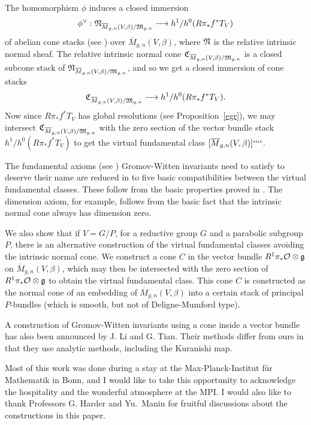 \documentclass{article}
\newcommand{\dual}[1]{{{#1}^{\vee}}}
\newcommand{\virt}{\mbox{\tiny virt}}
\newcommand{\upst}{^{\ast}}
\newcommand{\lst}{_{\ast}}
\newcommand{\NN}{{\frak N}}
\newcommand{\MM}{{\frak M}}
\newcommand{\Gg}{{\frak g}}
\newcommand{\CC}{{\frak C}}
\renewcommand{\O}{{\cal O}}
\newcommand{\ol}{\overline}
\begin{document}
The homomorphism $\phi$ induces a closed immersion
\[\dual{\phi}:\NN_{\ol{M}_{g,n}(V,\beta) / \MM_{g,n}}\longrightarrow
h^1/h^0(R\pi\lst f\upst T_V)\] of abelian cone stacks (see \cite{BF})
over $\ol{M}_{g,n}(V,\beta)$, where $\NN$ is the relative intrinsic
normal sheaf. The relative intrinsic normal cone
$\CC_{\ol{M}_{g,n}(V,\beta) / \MM_{g,n}}$ is a closed subcone stack of
$\NN_{\ol{M}_{g,n}(V,\beta) / \MM_{g,n}}$, and so we get a closed
immersion of cone stacks $$\CC_{\ol{M}_{g,n}(V,\beta) /
\MM_{g,n}} \longrightarrow h^1/h^0(R\pi\lst f\upst T_V).$$ Now since
$R\pi\lst f\upst T_V$ has global resolutions (see
Proposition~\ref{egr}), we may intersect $\CC_{\ol{M}_{g,n}(V,\beta) /
\MM_{g,n}}$ with the zero section of the vector bundle stack
$h^1/h^0(R\pi\lst f\upst T_V)$ to get the virtual fundamental class
$[\ol{M}_{g,n}(V,\beta)]^{\virt}$.

The fundamental axioms (see \cite{KM}) Gromov-Witten invariants need
to satisfy to deserve their name are reduced in \cite{BM} to five
basic compatibilities between the virtual fundamental classes. These
follow from the basic properties proved in \cite{BF}. The dimension
axiom, for example, follows from the basic fact that the intrinsic
normal cone always has dimension zero.

We also show that if $V=G/P$, for a reductive group $G$ and a parabolic
subgroup $P$, there is an alternative construction of the virtual
fundamental classes avoiding the intrinsic normal cone. We construct a
cone $C$ in the vector bundle $R^1\pi\lst\O\otimes\Gg$ on
$\ol{M}_{g,n}(V,\beta)$, which may then be intersected with the zero
section of $R^1\pi\lst\O\otimes\Gg$ to obtain the virtual fundamental
class. This cone $C$ is constructed as the normal cone of an embedding
of $\ol{M}_{g,n}(V,\beta)$ into a certain stack of principal
$P$-bundles (which is smooth, but not of Deligne-Mumford type).

\smallskip

A construction of Gromov-Witten invariants using a cone inside a vector
bundle has also been announced by J. Li and G. Tian. Their methods
differ from ours in that they use analytic methods, including the
Kuranishi map.

\smallskip

Most of this work was done during a stay at the Max-Planck-Institut
f\"ur Mathematik in Bonn, and I would like to take this opportunity to
acknowledge the hospitality and the wonderful atmosphere at the MPI\@.
I would also like to thank Professors G. Harder and Yu.\ Manin for fruitful
discussions about the constructions in this paper.
\end{document}
